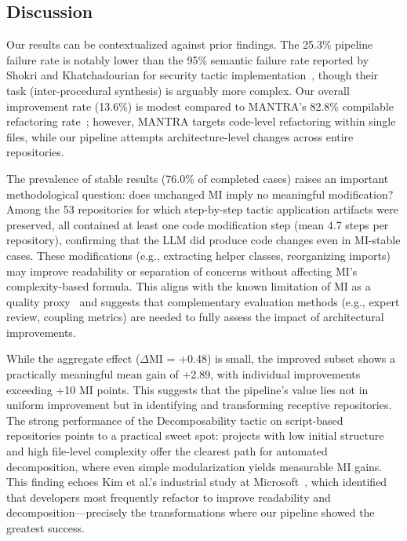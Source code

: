 \documentclass[sigconf,review,anonymous]{acmart}
\begin{document}
\subsection{Discussion}
Our results can be contextualized against prior findings. The 25.3\% pipeline failure rate is notably lower than the 95\% semantic failure rate reported by Shokri and Khatchadourian for security tactic implementation~\cite{shokri2024ipsynth}, though their task (inter-procedural synthesis) is arguably more complex. Our overall improvement rate (13.6\%) is modest compared to MANTRA's 82.8\% compilable refactoring rate~\cite{xu2025mantra}; however, MANTRA targets code-level refactoring within single files, while our pipeline attempts architecture-level changes across entire repositories.

The prevalence of stable results (76.0\% of completed cases) raises an important methodological question: does unchanged MI imply no meaningful modification? Among the 53 repositories for which step-by-step tactic application artifacts were preserved, all contained at least one code modification step (mean 4.7 steps per repository), confirming that the LLM did produce code changes even in MI-stable cases. These modifications (e.g., extracting helper classes, reorganizing imports) may improve readability or separation of concerns without affecting MI's complexity-based formula. This aligns with the known limitation of MI as a quality proxy~\cite{lenarduzzi2023critical} and suggests that complementary evaluation methods (e.g., expert review, coupling metrics) are needed to fully assess the impact of architectural improvements.

While the aggregate effect ($\Delta$MI = +0.48) is small, the improved subset shows a practically meaningful mean gain of +2.89, with individual improvements exceeding +10 MI points. This suggests that the pipeline's value lies not in uniform improvement but in identifying and transforming receptive repositories. The strong performance of the Decomposability tactic on script-based repositories points to a practical sweet spot: projects with low initial structure and high file-level complexity offer the clearest path for automated decomposition, where even simple modularization yields measurable MI gains. This finding echoes Kim et al.'s industrial study at Microsoft~\cite{kim2014refactoring}, which identified that developers most frequently refactor to improve readability and decomposition---precisely the transformations where our pipeline showed the greatest success.
\end{document}
